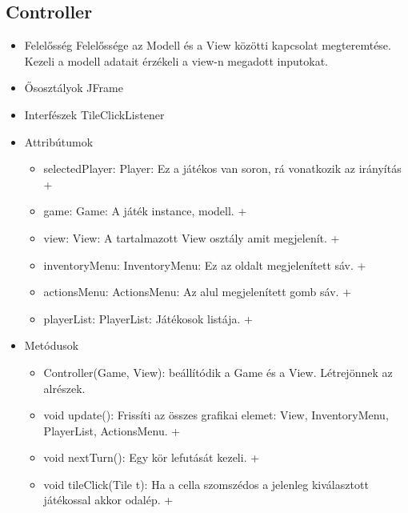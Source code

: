 \subsection{Controller}
\begin{itemize}
	\item Felelősség\newline
	Felelőssége az Modell és a View közötti kapcsolat megteremtése. Kezeli a modell adatait érzékeli a view-n megadott inputokat.
	\item Ősosztályok\newline
	JFrame
	\item Interfészek\newline
	TileClickListener
	\item Attribútumok\newline
	\begin{itemize}
		\item selectedPlayer: Player: Ez a játékos van soron, rá vonatkozik az irányítás +
		\item game: Game: A játék instance, modell. +
		\item view: View: A tartalmazott View osztály amit megjelenít. +
		\item inventoryMenu: InventoryMenu: Ez az oldalt megjelenített sáv. +
		\item actionsMenu: ActionsMenu: Az alul megjelenített gomb sáv. +
		\item playerList: PlayerList: Játékosok listája. +	
	\end{itemize}
	\item Metódusok\newline
	\begin{itemize}
		\item Controller(Game, View): beállítódik a Game és a View. Létrejönnek az alrészek.
		\item void update(): Frissíti az összes grafikai elemet: View, InventoryMenu, PlayerList, ActionsMenu. +
		\item void nextTurn(): Egy kör lefutását kezeli. +
		\item void tileClick(Tile t): Ha a cella szomszédos a jelenleg kiválasztott játékossal akkor odalép. +
	\end{itemize}
\end{itemize}

